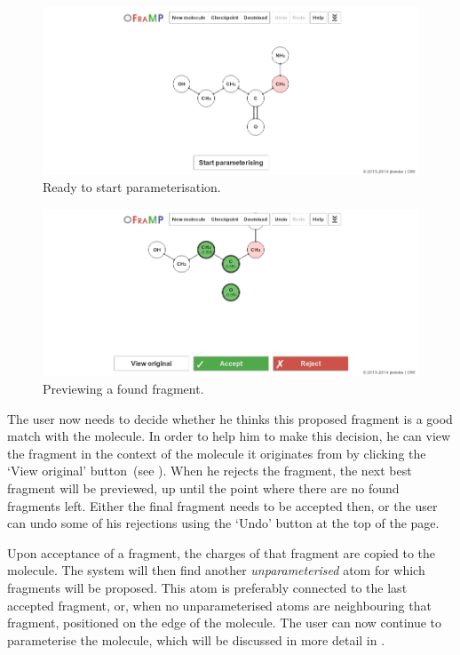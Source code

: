 \begin{figure}
\center
\includegraphics[width=.9\textwidth]{img/find_3.png}
\caption{Ready to start parameterisation.}
\end{figure}

\begin{figure}
\center
\includegraphics[width=.9\textwidth]{img/find_4.png}
\caption{Previewing a found fragment.}
\end{figure}

The user now needs to decide whether he thinks this proposed fragment is a good match with the molecule. In order to help him to make this decision, he can view the fragment in the context of the molecule it originates from by clicking the `View original' button~(see ). When he rejects the fragment, the next best fragment will be previewed, up until the point where there are no found fragments left. Either the final fragment needs to be accepted then, or the user can undo some of his rejections using the `Undo' button at the top of the page.

Upon acceptance of a fragment, the charges of that fragment are copied to the molecule. The system will then find another \emph{unparameterised} atom for which fragments will be proposed. This atom is preferably connected to the last accepted fragment, or, when no unparameterised atoms are neighbouring that fragment, positioned on the edge of the molecule. The user can now continue to parameterise the molecule, which will be discussed in more detail in .


